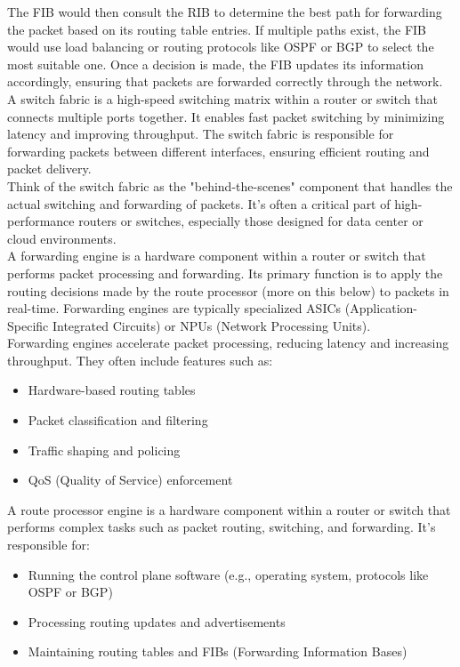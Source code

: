 \documentclass[parindent=0pt]{article}
\begin{document}
The FIB would then consult the RIB to determine the best path for forwarding the packet based on its routing table entries. If multiple paths exist, the FIB would use load balancing or routing protocols like OSPF or BGP to select the most suitable one. Once a decision is made, the FIB updates its information accordingly, ensuring that packets are forwarded correctly through the network.\\

A switch fabric is a high-speed switching matrix within a router or switch that connects multiple ports together. It enables fast packet switching by minimizing latency and improving throughput. The switch fabric is responsible for forwarding packets between different interfaces, ensuring efficient routing and packet delivery.\\

Think of the switch fabric as the "behind-the-scenes" component that handles the actual switching and forwarding of packets. It's often a critical part of high-performance routers or switches, especially those designed for data center or cloud environments.\\

A forwarding engine is a hardware component within a router or switch that performs packet processing and forwarding. Its primary function is to apply the routing decisions made by the route processor (more on this below) to packets in real-time. Forwarding engines are typically specialized ASICs (Application-Specific Integrated Circuits) or NPUs (Network Processing Units).\\

Forwarding engines accelerate packet processing, reducing latency and increasing throughput. They often include features 
such as:
	\begin{itemize}
		\item Hardware-based routing tables 
		\item Packet classification and filtering 
		\item Traffic shaping and policing 
		\item QoS (Quality of Service) enforcement 
	\end{itemize}

A route processor engine is a hardware component within a router or switch that performs complex tasks such as packet routing, switching, and forwarding. It's responsible for:
	\begin{itemize}
		\item Running the control plane software (e.g., operating system, protocols like OSPF or BGP) 
		\item Processing routing updates and advertisements 
		\item Maintaining routing tables and FIBs (Forwarding Information Bases) 
	\end{itemize}
\end{document}
